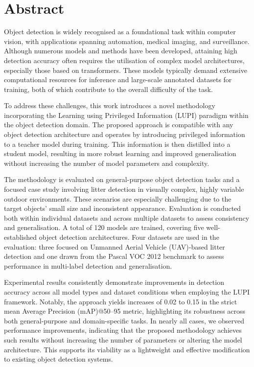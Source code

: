 \chapter*{Abstract}

Object detection is widely recognised as a foundational task within computer vision, with applications spanning automation, medical imaging, and surveillance. Although numerous models and methods have been developed, attaining high detection accuracy often requires the utilisation of complex model architectures, especially those based on transformers. These models typically demand extensive computational resources for inference and large-scale annotated datasets for training, both of which contribute to the overall difficulty of the task.

To address these challenges, this work introduces a novel methodology incorporating the Learning using Privileged Information (LUPI) paradigm within the object detection domain. The proposed approach is compatible with any object detection architecture and operates by introducing privileged information to a teacher model during training. This information is then distilled into a student model, resulting in more robust learning and improved generalisation without increasing the number of model parameters and complexity.

The methodology is evaluated on general-purpose object detection tasks and a focused case study involving litter detection in visually complex, highly variable outdoor environments. These scenarios are especially challenging due to the target objects' small size and inconsistent appearance. Evaluation is conducted both within individual datasets and across multiple datasets to assess consistency and generalisation. A total of 120 models are trained, covering five well-established object detection architectures. Four datasets are used in the evaluation: three focused on Unmanned Aerial Vehicle (UAV)-based litter detection and one drawn from the Pascal VOC 2012 benchmark to assess performance in multi-label detection and generalisation.

Experimental results consistently demonstrate improvements in detection accuracy across all model types and dataset conditions when employing the LUPI framework. Notably, the approach yields increases of 0.02 to 0.15 in the strict mean Average Precision (mAP)@50--95 metric, highlighting its robustness across both general-purpose and domain-specific tasks. In nearly all cases, we observed performance improvements, indicating that the proposed methodology achieves such results without increasing the number of parameters or altering the model architecture. This supports its viability as a lightweight and effective modification to existing object detection systems.

